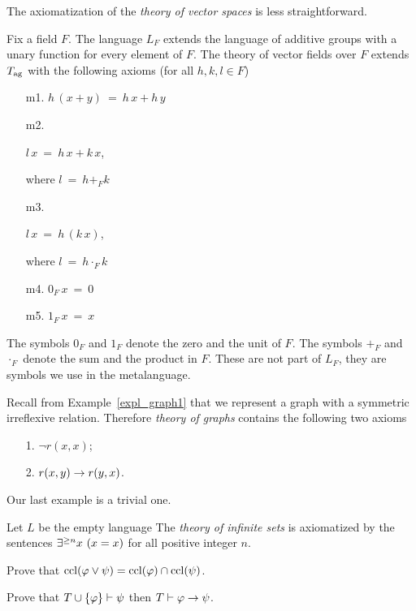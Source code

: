 \documentclass[creche.tex]{subfiles}
\begin{document}
The axiomatization of the \emph{theory of vector spaces\/} is less straightforward.

\begin{example}\label{ex_ax_vect_sp}
Fix a field $F$.
The language $L_F$ extends the language of additive groups with a unary function for every element of $F$.
The theory of vector fields over $F$ extends $T_{\rm ag}$ with the following axioms (for all $h,k,l\in F$)
\begin{itemize}
\item[m1.] $h\,(x+y)\ =\ h\,x+h\,y$
\item[m2.] \parbox{25ex}{$l\,x\ =\ h\,x+k\,x$,} where $l\ =\ h+_Fk$
\item[m3.] \parbox{25ex}{$l\,x\ =\ h\,(k\,x)$,} where $l\ =\ h\cdot_Fk$
\item[m4.] $0_F\,x\ =\ 0$
\item[m5.] $1_F\,x\ =\ x$
\end{itemize}
The symbols $0_F$ and $1_F$ denote the zero and the unit of $F$.
The symbols $+_F$ and $\cdot_F$ denote the sum and the product in $F$.
These are not part of $L_F$, they are symbols we use in the metalanguage.\QED
\end{example}

\begin{example}\label{expl_Tgraphs}
Recall from Example~\ref{expl_graph1} that we represent a graph with a symmetric irreflexive relation.
Therefore \emph{theory of graphs\/} contains the following two axioms

\begin{itemize}
\item[1.] $\neg r(x,x)$;
\item[2.] $r(x,y)\rightarrow r(y,x)$.\QED
\end{itemize}
\end{example}

Our last example is a trivial one.

\begin{example}
Let $L$ be the empty language The \emph{theory of infinite sets\/} is axiomatized by the sentences $\E^{\ge n} x\ (x=x)$ for all positive integer $n$.\QED
\end{example}


\begin{exercise}
Prove that ${\rm ccl}(\varphi\vee \psi)={\rm ccl}(\varphi)\cap{\rm ccl}(\psi)$.\QED
\end{exercise}

\begin{exercise}\label{modus ponens}
Prove that $T\cup\{\varphi\}\vdash\psi$ then $T\vdash\varphi\rightarrow\psi$.\QED
\end{exercise}
\end{document}
